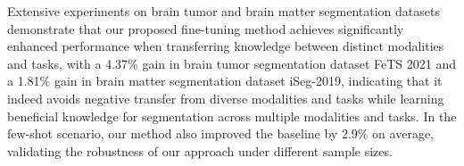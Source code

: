 
Extensive experiments on brain tumor and brain matter segmentation datasets demonstrate that our proposed fine-tuning method achieves significantly enhanced performance when transferring knowledge between distinct modalities and tasks, with a 4.37\% gain in brain tumor segmentation dataset FeTS 2021 and a 1.81\% gain in brain matter segmentation dataset iSeg-2019, indicating that it indeed avoids negative transfer from diverse modalities and tasks while learning beneficial knowledge for segmentation across multiple modalities and tasks. In the few-shot scenario, our method also improved the baseline by 2.9\% on average, validating the robustness of our approach under different sample sizes.  
   
